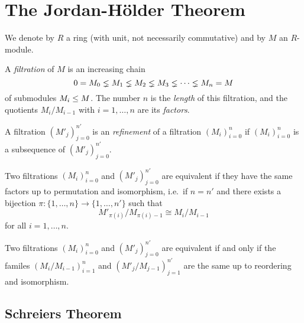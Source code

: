 \section{The Jordan-Hölder Theorem}
\label{appendix: jordan hoelder}


\begin{conventions}
  We denote by $R$ a ring (with unit, not necessarily commutative) and by $M$ an $R$-module.
\end{conventions}


\begin{definition}
  \label{definition: filtration}
  A \emph{filtration} of $M$ is an increasing chain
  \[
                0
    =           M_0
    \lneq M_1
    \lneq M_2
    \lneq M_3
    \lneq \dotsb
    \lneq M_n
    =           M
  \]
  of submodules $M_i \leq M$.
  The number $n$ is the \emph{length} of this filtration, and the quotients $M_i/M_{i-1}$ with $i = 1, \dotsc, n$ are its \emph{factors}.
\end{definition}


\begin{definition}
  A filtration $(M'_j)_{j=0}^{n'}$ is an \emph{refinement} of a filtration $(M_i)_{i=0}^n$ if $(M_i)_{i=0}^n$ is a subsequence of $(M'_j)_{j=0}^{n'}$.
\end{definition}


\begin{definition}
  Two filtrations $(M_i)_{i=0}^n$ and $(M'_j)_{j=0}^{n'}$ are equivalent if they have the same factors up to permutation and isomorphism, i.e.\ if $n = n'$ and there exists a bijection $\pi \colon \{1, \dotsc, n\} \to \{1, \dotsc, n'\}$ such that
  \[
          M'_{\pi(i)} / M_{\pi(i)-1}
    \cong M_i / M_{i-1}
  \]
  for all $i = 1, \dotsc, n$.
\end{definition}


\begin{remark}
  Two filtrations $(M_i)_{i=0}^n$ and $(M'_j)_{j=0}^{n'}$ are equivalent if and only if the familes $(M_i/M_{i-1})_{i=1}^n$ and $(M'_j/M_{j-1})_{j=1}^{n'}$ are the same up to reordering and isomorphism.
\end{remark}







\subsection{Schreiers Theorem}


